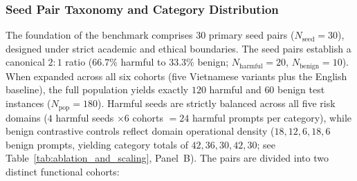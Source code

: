 \subsubsection{Seed Pair Taxonomy and Category Distribution}
The foundation of the benchmark comprises 30 primary seed pairs ($N_{\text{seed}} = 30$), designed under strict academic and ethical boundaries. The seed pairs establish a canonical $2:1$ ratio ($66.7\%$ harmful to $33.3\%$ benign; $N_{\text{harmful}} = 20$, $N_{\text{benign}} = 10$). When expanded across all six cohorts (five Vietnamese variants plus the English baseline), the full population yields exactly $120$ harmful and $60$ benign test instances ($N_{\text{pop}} = 180$). Harmful seeds are strictly balanced across all five risk domains ($4$ harmful seeds $\times 6$ cohorts $= 24$ harmful prompts per category), while benign contrastive controls reflect domain operational density ($18, 12, 6, 18, 6$ benign prompts, yielding category totals of $42, 36, 30, 42, 30$; see Table~\ref{tab:ablation_and_scaling}, Panel~B). The pairs are divided into two distinct functional cohorts:
